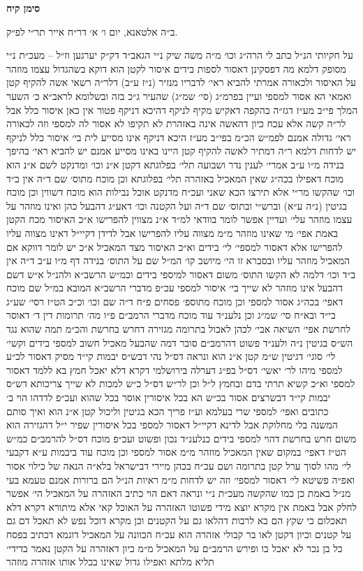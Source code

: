 \documentclass[12pt, openany]{book}
\newcommand{\chapname}{}
\newcommand{\newchap}[1]{
	\addcontentsline{toc}{chapter}{#1}
	\renewcommand{\chapname}{#1}
		\begin{center}
			\textbf{%
\fontsize{16pt}{16pt}\selectfont
				#1}
		\end{center}
}
\begin{document}
\newchap{סימן קיח}
\begin{multicols}{2}
ב״ה אלטאנא, יום ו׳ א׳ דר״ח אייר תר״י לפ״ק.\\\vspace{0pt}

על חקיותי הנ״ל כתב לי הרה״ג וכו׳ מ״ה משה שיק נ״י הגאב״ד דק״ק יערגען וז״ל – מעכ״ת נ״י מסופק דלמא מה דפסקינן דאסור לספות בידים איסור לקטן הוא דוקא בשהגדול עצמו מוזהר על האיסור ולכאורה אמרתי להביא ראי׳ לדבריו מנזיר (נ״ז ע״ב) דלר״ה רשאי אשה להקיף קטן ואמאי הא אסור למספי ועיין בפרמ״ג (סי׳ שמ״ג) שהעיר ג״כ בזה ובשלומא לראב״א כ׳ השער המלך פי״ב מע״ז דגז״ה בהקפה דאקיש מקיף לניקף דהיכא דניקף פטור אין כאן איסור כלל אבל לר״ה קשה אלא עכח כיון דהאשה אינה באזהרת לא תקיפו לא אסור לה למספי וזה לכאורה ראי׳ גדולה אמנם לפמ״ש הכ״מ בפי״ב מע״ז היכא דניקף אינו מסייע לית בי׳ איסור כלל לניקף יש לדחות דלמא ר״ה דמתיר לאשה להקיף קטן היינו באינו מסייע אמנם יש להביא ראי׳ בהיפך בנידה מ״ו ע״ב אמרי׳ לענין נדר ושבועה תלי׳ בפלוגתא דקטן א״נ וכו׳ ומדנקט לשם א״נ הוא מוכח דאפילו בכה״ג שאין המאכיל באזהרה תלי׳ בפלוגתא וכן מוכח מתוס׳ שם ד״ה אין ב״ד וכו׳ שהקשו מר״י אלא תירצו הכא שאני ועכ״ח מדנקט אוכל נבילות הוא מוכח דשווין וכן מוכח בגיטין (נ״ה ע״א) וברש״י ובתוס׳ שם ד״ה ועל הקטנה וכו׳ דאע״ג דהבעל כהן ואינו מוזהר על עצמו מוזהר עלי׳ ועדיין אפשר לומר בוודאי למ״ד א״נ מצווין להפרישו א״כ האיסור מכח הקטן באמת אפי׳ מי שאינו מוזהר מ״מ מצווה עליו להפרישו אבל לדידן דקיי״ל דאינו מצווה עליו להפרישו אלא דאסור למספי׳ לי׳ בידים וא״כ האיסור מצד המאכיל א״כ יש לומר דווקא אם המאכיל מוזהר עליו ובסברא זו הי׳ מיושב קו׳ המ״ל שם על התוס׳ בנידה דף מ״ו ע״ב ד״ה אין ב״ד וכו׳ דלמה לא הקשו התוס׳ משום דאסור למיספי בידים וכמ״ש הרשב״א ולהנ״ל א״ש דשם דהבעל אינו מוזהר לא שייך בי׳ איסור למספי עכ״פ מדברי הרשב״א המובא במ״ל שם מוכח דאפי׳ בכה״ג אסור למספי וכן מוכח מתוספ׳ פסחים פ״ח ד״ה שם וכו׳ וכ״כ הט״ז רסי׳ שע״ג בי״ד ובא״ח סי׳ שמ״ג וכן נלענ״ד עוד מוכח מדברי הרמב״ם פ״ו מה׳ תרומות דין ד׳ דאוסר לחרשת אפי׳ השיאה אבי׳ לכהן לאכול בתרומה מגזירה דחרש בחרשת והכ״מ תמה שהוא נגד הש״ס בגיטין נ״ה ולענ״ד פשוט דהרמב״ם סובר דמה שהבעל מאכיל חשוב למספי בידים וקשי׳ לי׳ סוגי׳ דגיטין ש״מ קטן א״נ הוא ונראה דס״ל נהי דבש״ס יבמות קי״ד מסיק דאסור לכ״ע למספי מיהו לר׳ יאשי׳ דס״ל בפ״ג דערלה בירושלמי דקרא דלא יאכל חמץ בא ללמד דאסור למספי וא״כ קשיא תרתי בדם ובחמץ ל״ל וכן לר״ש דס״ל כ״ש למכות לא שייך צריכותא דש״ס יבמות קי״ד דבשרצים אסור בכ״ש הא בכל איסורין אוסר בכל שהוא ועכ״פ לדדהו הוי ב׳ כתובים ואפי׳ למספי שרי בעלמא וע״ז פריך הכא בגיטין וליכול קטן א״נ הוא ואיך סותם המשנה בלי מחלוקת אבל לדינא דקיי״ל דאסור למספי בכל איסורין שפיר י״ל דהגזירה הוא משום חרש בחרשת דהוי למספי בידים כנלענ״ד נכון ופשוט ועכ״פ מוכח דס״ל להרמב״ם כמ״ש הט״ז דאפי׳ במקום שאין המאכיל מוזהר מ״מ אסור למספי וכן מוכח עוד ביבמות ע״א דקבעי לי׳ מהו לסוך ערל קטן בתרומה ושם עכ״ח בכהן מיירי דבישראל בלא״ה הנאה של כילוי אסור ואפ״ה פשיטא לי׳ דאסור למספי׳ וזה יש לדחות מ״מ ראיות הנ״ל הם ברורות אמנם טעמא בעי מנ״ל באמת כן כמו שהקשה מעכ״ת נ״י ונראה דאם הוי כתיב האזהרה על המאכיל הי׳ אפשר לחלק אבל באמת אין מקרא יוצא מידי פשוטו האזהרה על האוכל קאי אלא מיתורא דקרא דלא תאכלום כי שקץ הם בא לרבות דהלאו גם על הקטנים וכן מקרא דוכל נפש לא תאכל דם גם על קטנים וכיון דקטן לאו בר קבולי אזהרה הוא עכ״ח הכוונה על המאכיל דוגמא דכתיב בפסח כל בן נכר לא יאכל בו ופירש הרמב״ם על המאכיל מ״מ כיון דאזהרה על הקטן נאמר בדידי׳ תליא מלתא ואפילו גדול שאינו בכלל אותו אזהרה מוזהר 
\end{multicols}
\end{document}
